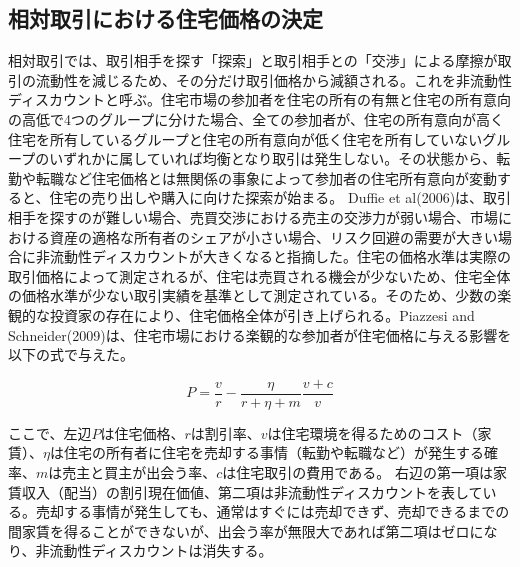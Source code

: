 \documentclass[a4paper,fontsize=11pt,report,notitlepage,line_length=38zw,number_of_lines=40,dvipdfmx]{jlreq}
\begin{document}
\subsection{相対取引における住宅価格の決定}
相対取引では、取引相手を探す「探索」と取引相手との「交渉」による摩擦が取引の流動性を減じるため、その分だけ取引価格から減額される。これを非流動性ディスカウントと呼ぶ。住宅市場の参加者を住宅の所有の有無と住宅の所有意向の高低で4つのグループに分けた場合、全ての参加者が、住宅の所有意向が高く住宅を所有しているグループと住宅の所有意向が低く住宅を所有していないグループのいずれかに属していれば均衡となり取引は発生しない。その状態から、転勤や転職など住宅価格とは無関係の事象によって参加者の住宅所有意向が変動すると、住宅の売り出しや購入に向けた探索が始まる。
Duffie et al(2006)\cite{duffie2007}は、取引相手を探すのが難しい場合、売買交渉における売主の交渉力が弱い場合、市場における資産の適格な所有者のシェアが小さい場合、リスク回避の需要が大きい場合に非流動性ディスカウントが大きくなると指摘した。住宅の価格水準は実際の取引価格によって測定されるが、住宅は売買される機会が少ないため、住宅全体の価格水準が少ない取引実績を基準として測定されている。そのため、少数の楽観的な投資家の存在により、住宅価格全体が引き上げられる。Piazzesi and Schneider(2009)\cite{piazzesi2009}は、住宅市場における楽観的な参加者が住宅価格に与える影響を以下の式で与えた。


\begin{equation}
P=\dfrac{v}{r}-\dfrac{\eta}{r+\eta+m}\dfrac{v+c}{v}
\end{equation}

ここで、左辺$P$は住宅価格、$r$は割引率、$v$は住宅環境を得るためのコスト（家賃）、$\eta$は住宅の所有者に住宅を売却する事情（転勤や転職など）が発生する確率、$m$は売主と買主が出会う率、$c$は住宅取引の費用である。
右辺の第一項は家賃収入（配当）の割引現在価値、第二項は非流動性ディスカウントを表している。売却する事情が発生しても、通常はすぐには売却できず、売却できるまでの間家賃を得ることができないが、出会う率が無限大であれば第二項はゼロになり、非流動性ディスカウントは消失する。
\end{document}
